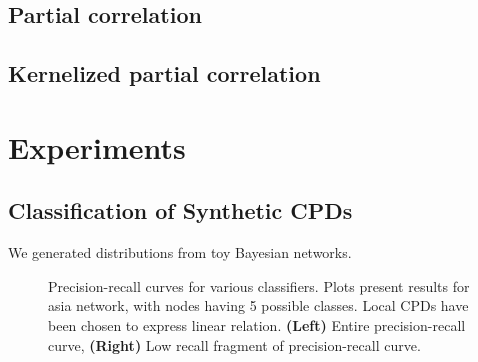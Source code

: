 \documentclass{article} %
\begin{document}
\subsection{Partial correlation}

\subsection{Kernelized partial correlation}

\section{Experiments}

\subsection{Classification of Synthetic CPDs}
We generated distributions from toy Bayesian networks.

\begin{figure}[h]
\centering
{}
\caption{Precision-recall curves for various classifiers. Plots present
results for asia network, with nodes having 5 possible classes. Local CPDs
have been chosen to express linear relation. {\bf (Left)} Entire 
precision-recall curve, {\bf (Right)} Low recall fragment of precision-recall curve.}

\end{figure}
\end{document}
